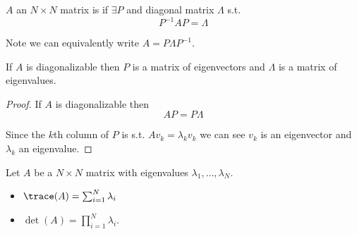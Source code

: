 \documentclass{article}
\begin{document}
\begin{definition}
  $A$ an $N \times N$ matrix is  if $\exists P$ and diagonal matrix $\Lambda$ s.t.
  \[
    P^{-1} A P = \Lambda
  \]

  Note we can equivalently write $A = P \Lambda P^{-1}$.
\end{definition}

\begin{claim}
  If $A$ is diagonalizable then $P$ is a matrix of eigenvectors and $\Lambda$ is a matrix of eigenvalues.
\end{claim}

\begin{proof}
  If $A$ is  diagonalizable then
  \[
    A P = P \Lambda
  \]

  Since the $k$th column of $P$ is s.t. $A v_k = \lambda_k v_k$ we can see $v_k$ is an eigenvector and $\lambda_k$ an eigenvalue.
\end{proof}

\begin{theorem}
  Let $A$ be a $N \times N$ matrix with eigenvalues $\lambda_1, \ldots, \lambda_N$.
  \begin{itemize}[label=$\bullet$]
    \item $\trace(A) = \sum^{N}_{i = 1} \lambda_i$
    \item $\det(A) = \prod_{i = 1}^N \lambda_i$.
  \end{itemize}
\end{theorem}
\end{document}
